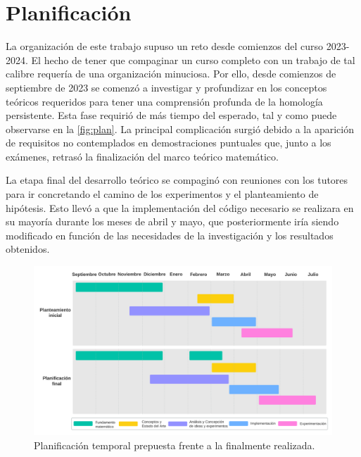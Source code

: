 \section{Planificación}

La organización de este trabajo supuso un reto desde comienzos del curso 2023-2024.
El hecho de tener que compaginar un curso completo con un trabajo de tal calibre
requería de una organización minuciosa. Por ello, desde comienzos de septiembre
de 2023 se comenzó a investigar y profundizar en los conceptos teóricos
requeridos para tener una comprensión profunda de la homología persistente. Esta
fase requirió de más tiempo del esperado, tal y como puede observarse en la
\autoref{fig:plan}. La principal complicación surgió debido a la aparición de requisitos
no contemplados en demostraciones puntuales que, junto a los exámenes, retrasó la
finalización del marco teórico matemático.

La etapa final del desarrollo teórico se compaginó con reuniones con los tutores
para ir concretando el camino de los experimentos y el planteamiento de hipótesis.
Esto llevó a que la implementación del código necesario se realizara en su
mayoría durante los meses de abril y mayo, que posteriormente iría siendo modificado
en función de las necesidades de la investigación y los resultados obtenidos.

\begin{figure}[H]
	\centering
	\includegraphics[width=150mm]{img/planificacion.png}
	\caption{Planificación temporal prepuesta frente a la finalmente realizada.}
	\label{fig:plan}
\end{figure}

\endinput